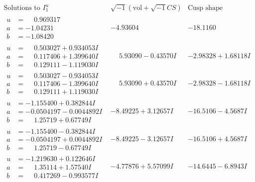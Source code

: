 \documentclass[1p]{elsarticle_modified}
\theoremstyle{definition}
\newcommand{\I}{\sqrt{-1}}
\begin{document}
$$\begin{array}{c|c|c}  
\text{Solutions to }I^u_{1}& \I (\text{vol} + \sqrt{-1}CS) & \text{Cusp shape}\\
 \hline 
\begin{aligned}
u &= \phantom{-}0.969317\phantom{ +0.000000I} \\
a &= -1.04231\phantom{ +0.000000I} \\
b &= -1.08420\phantom{ +0.000000I}\end{aligned}
 & -4.93604\phantom{ +0.000000I} & -18.1160\phantom{ +0.000000I} \\ \hline\begin{aligned}
u &= \phantom{-}0.503027 + 0.934053 I \\
a &= \phantom{-}0.117406 + 1.399640 I \\
b &= \phantom{-}0.129111 - 1.119030 I\end{aligned}
 & \phantom{-}5.93090 - 0.43570 I & -2.98328 + 1.68118 I \\ \hline\begin{aligned}
u &= \phantom{-}0.503027 - 0.934053 I \\
a &= \phantom{-}0.117406 - 1.399640 I \\
b &= \phantom{-}0.129111 + 1.119030 I\end{aligned}
 & \phantom{-}5.93090 + 0.43570 I & -2.98328 - 1.68118 I \\ \hline\begin{aligned}
u &= -1.155400 + 0.382844 I \\
a &= -0.0504197 - 0.0044892 I \\
b &= \phantom{-}1.25719 + 0.67749 I\end{aligned}
 & -8.49225 + 3.12657 I & -16.5106 - 4.5687 I \\ \hline\begin{aligned}
u &= -1.155400 - 0.382844 I \\
a &= -0.0504197 + 0.0044892 I \\
b &= \phantom{-}1.25719 - 0.67749 I\end{aligned}
 & -8.49225 - 3.12657 I & -16.5106 + 4.5687 I \\ \hline\begin{aligned}
u &= -1.219630 + 0.122646 I \\
a &= \phantom{-}1.35114 + 1.57540 I \\
b &= \phantom{-}0.417269 - 0.993577 I\end{aligned}
 & -4.77876 + 5.57099 I & -14.6445 - 6.8943 I \\ \hline\begin{aligned}

\end{aligned}
\end{array}$$
\end{document}
